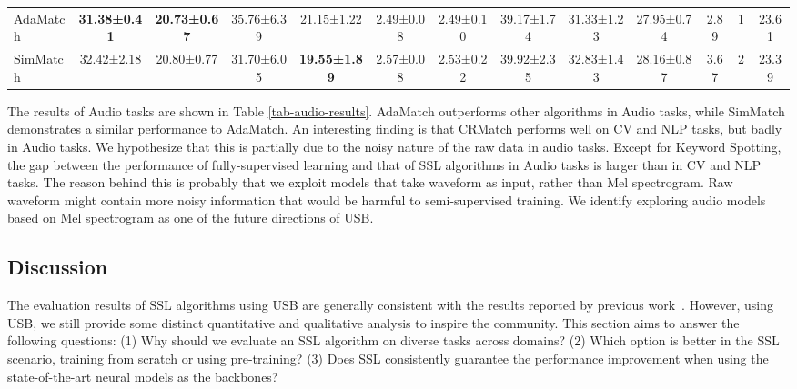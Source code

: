 \documentclass{article}
\begin{document}
\begin{table}[t!]
{\begin{tabular}{l|cc|cc|cc|cc|c|c|c|c}
AdaMatch         & \textbf{31.38\tiny{±0.41}} & \textbf{20.73\tiny{±0.67}} & 35.76\tiny{±6.39}          & 21.15\tiny{±1.22}          & 2.49\tiny{±0.08}          & 2.49\tiny{±0.10}          & 39.17\tiny{±1.74}          & 31.33\tiny{±1.23}          & 27.95\tiny{±0.74}          & 2.89                              & 1                              & 23.61                               \\
SimMatch         & 32.42\tiny{±2.18}          & 20.80\tiny{±0.77}          & 31.70\tiny{±6.05}          & \textbf{19.55\tiny{±1.89}} & 2.57\tiny{±0.08}          & 2.53\tiny{±0.22}          & 39.92\tiny{±2.35}          & 32.83\tiny{±1.43}          & 28.16\tiny{±0.87}          & 3.67                              & 2                              & 23.39                              \\

\bottomrule
\end{tabular}
}
\end{table}

The results of Audio tasks are shown in Table \ref{tab-audio-results}. AdaMatch outperforms other algorithms in Audio tasks, while SimMatch demonstrates a similar performance to AdaMatch. An interesting finding is that CRMatch performs well on CV and NLP tasks, but badly in Audio tasks. We hypothesize that this is partially due to the noisy nature of the raw data in audio tasks. Except for Keyword Spotting, the gap between the performance of fully-supervised learning and that of SSL algorithms in Audio tasks is larger than in CV and NLP tasks. The reason behind this is probably that we exploit models that take waveform as input, rather than Mel spectrogram. Raw waveform might contain more noisy information that would be harmful to semi-supervised training. We identify exploring audio models based on Mel spectrogram as one of the future directions of USB.





\subsection{Discussion} 
\label{sec-results-analysis}

The evaluation results of SSL algorithms using USB are generally consistent with the results reported by previous work~\cite{oliver2018realistic,berthelot2019mixmatch,berthelot2019remixmatch,xie2020unsupervised,sohn2020fixmatch,zhang2021flexmatch}. However, using USB, we still provide some distinct quantitative and qualitative analysis to inspire the community. This section aims to answer the following questions: (1) Why should we evaluate an SSL algorithm on diverse tasks across domains? (2) Which option is better in the SSL scenario, training from scratch or using pre-training? (3) Does SSL consistently guarantee the performance improvement when using the state-of-the-art neural models as the backbones? 
\end{document}
